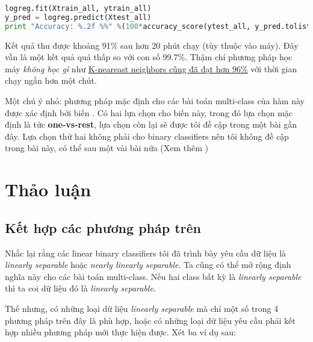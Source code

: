 \begin{lstlisting}[language=Python]
logreg.fit(Xtrain_all, ytrain_all) 
y_pred = logreg.predict(Xtest_all) 
print "Accuracy: %.2f %%" %(100*accuracy_score(ytest_all, y_pred.tolist())) 
\end{lstlisting}
 
Kết quả thu được khoảng 91\% sau hơn 20 phút chạy (tùy thuộc vào máy). Đây vẫn là một kết quả quá thấp so với con số 99.7\%. Thậm chí phương pháp học máy \textit{không học gì} như \href{http://machinelearningcoban.com/2017/01/08/knn/#try-this-yourself}{K-neareast neighbors cũng đã đạt hơn 96\%} với thời gian chạy ngắn hơn một chút.  
 
Một chú ý nhỏ: phương pháp mặc định cho các bài toán multi-class của hàm này được xác định bởi biến . Có hai lựa chọn cho biến này, trong đó lựa chọn mặc định là  tức \textbf{one-vs-rest}, lựa chọn còn lại sẽ được tôi đề cập trong một bài gần đây. Lựa chọn thứ hai không phải cho binary classifiers nên tôi không đề cập trong bài này, có thể sau một vài bài nữa (Xem thêm \href{http://scikit-learn.org/stable/modules/generated/sklearn.linear_model.LogisticRegression.html}{}) 
 
 
 
\section{Thảo luận }
 
\subsection{Kết hợp các phương pháp trên}
 
Nhắc lại rằng các linear binary classifiers tôi đã trình bày yêu cầu dữ liệu là \textit{linearly separable} hoặc \textit{nearly linearly separable}. Ta cũng có thể mở rộng định nghĩa này cho các bài toán multi-class. Nếu hai class bất kỳ là \textit{linearly separable} thì ta coi dữ liệu đó là \textit{linearly separable}.  
 
Thế nhưng, có những loại dữ liệu \textit{linearly separable} mà chỉ một số trong 4 phương pháp trên đây là phù hợp, hoặc có những loại dữ liệu yêu cầu phải kết hợp nhiều phương pháp mới thực hiện được. Xét ba ví dụ sau: 
 
 
